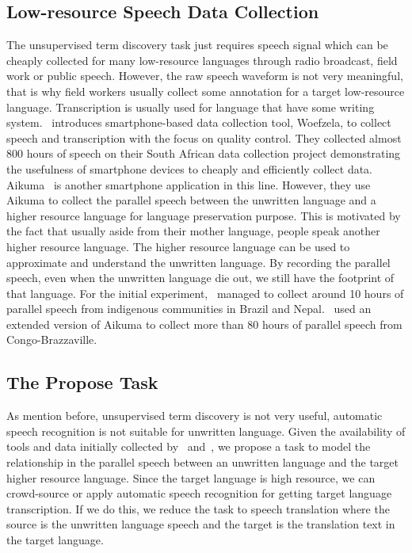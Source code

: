 \documentclass[12pt,twoside,final,hidelinks]{ltthesis}
\theoremstyle{definition}
\begin{document}
\subsection{Low-resource Speech Data Collection}
The unsupervised term discovery task just requires speech signal which can be cheaply collected for many low-resource languages through radio broadcast, field work 
or public speech. However, the raw speech waveform is not very meaningful, that is why field workers usually collect some annotation for a target low-resource 
language. Transcription is usually used for language that have some writing system.~ introduces smartphone-based data collection tool, 
Woefzela, to collect speech and transcription with the focus on quality control. They collected almost 800 hours of speech on their South African data collection 
project demonstrating the usefulness of smartphone devices to cheaply and efficiently collect data. Aikuma~\cite{bird-EtAl:2014:W14-22} is another smartphone application in this 
line. However, they use Aikuma to collect the parallel speech between the unwritten language and a higher resource language for language preservation purpose. This 
is motivated by the fact that usually aside from their mother language, people speak another higher resource language. The higher resource language can be used to 
approximate and understand the unwritten language. By recording the parallel speech, even when the unwritten language die out, we still have the footprint of that 
language. For the initial experiment,~ managed to collect around 10 hours of parallel speech from indigenous 
communities in Brazil and Nepal.~ used an extended version of Aikuma to collect more than 80 hours of parallel speech from Congo-Brazzaville. 

\subsection{The Propose Task}
As mention before, unsupervised term discovery is not very useful, automatic speech recognition is not suitable for unwritten language. Given the availability of tools and data initially collected by~ and~, we propose a task to model the relationship in the parallel speech between an unwritten language and the target higher resource language. Since the target language is high resource, we can crowd-source or apply automatic speech recognition for getting target language transcription. If we do this, we reduce the task to speech translation where the source is the unwritten language speech and the target is the translation text in the target language. 
\end{document}
